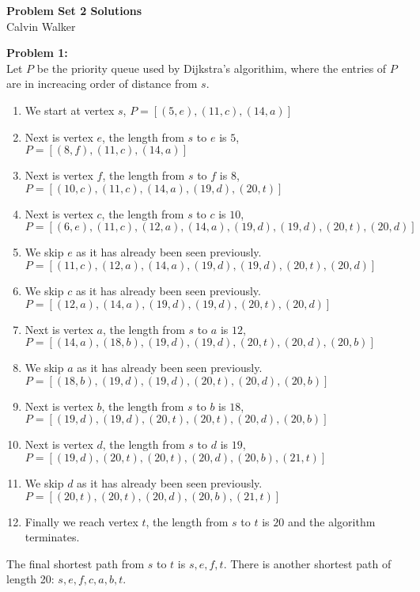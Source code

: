 \documentclass{article}
\begin{document}
\begin{center}
    \Large{\textbf{Problem Set 2 Solutions}} \\[0.25ex]
    Calvin Walker
\end{center}
\textbf{Problem 1:} \\[1.0ex]
Let $P$ be the priority queue used by Dijkstra's algorithim, where the entries of $P$ are in increacing order of distance from $s$.
\begin{enumerate}
    \item We start at vertex $s$, $P = [(5, e), (11, c), (14, a)]$
    \item Next is vertex $e$, the length from $s$ to $e$ is $5$, $P = [(8, f), (11, c), (14, a)]$
    \item Next is vertex $f$, the length from $s$ to $f$ is $8$, $P = [(10, c), (11, c), (14, a), (19, d), (20, t)]$
    \item Next is vertex $c$, the length from $s$ to $c$ is $10$, $P = [(6, e), (11, c), (12, a), (14, a), (19, d), (19, d), (20, t), (20, d)]$
    \item We skip $e$ as it has already been seen previously. $P = [(11, c), (12, a), (14, a), (19, d), (19, d), (20, t), (20, d)]$
    \item We skip $c$ as it has already been seen previously. $P = [(12, a), (14, a), (19, d), (19, d), (20, t), (20, d)]$
    \item Next is vertex $a$, the length from $s$ to $a$ is $12$, $P = [(14, a), (18, b), (19, d), (19, d), (20, t), (20, d), (20, b)]$
    \item We skip $a$ as it has already been seen previously. $P = [(18, b), (19, d), (19, d), (20, t), (20, d), (20, b)]$
    \item Next is vertex $b$, the length from $s$ to $b$ is $18$, $P = [(19, d), (19, d), (20, t), (20, t), (20, d), (20, b)]$
    \item Next is vertex $d$, the length from $s$ to $d$ is $19$, $P = [(19, d), (20, t), (20, t), (20, d), (20, b), (21, t)]$
    \item We skip $d$ as it has already been seen previously. $P = [(20, t), (20, t), (20, d), (20, b), (21, t)]$
    \item Finally we reach vertex $t$, the length from $s$ to $t$ is $20$ and the algorithm terminates. 
\end{enumerate}
The final shortest path from $s$ to $t$ is $s, e, f, t$. There is another shortest path of length 20: $s, e, f, c, a, b, t$. \\[1.0ex]
\end{document}

